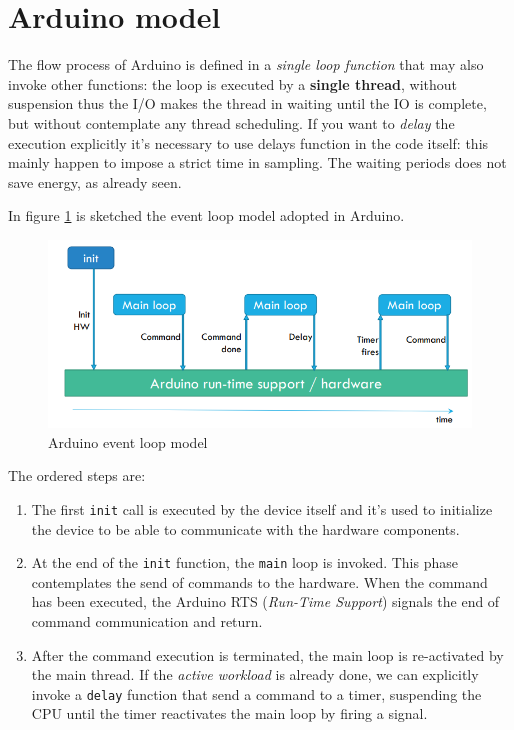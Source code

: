 \documentclass[10pt,a4paper]{report}
\theoremstyle{definition}
\begin{document}
\section{Arduino model}\label{sec:arduino-model}
The flow process of Arduino is defined in a \textit{single loop function} that may also invoke other functions: the loop is executed by a \textbf{single thread}, without suspension thus the I/O makes the thread in waiting until the IO is complete, but without contemplate any thread scheduling. If you want to \textit{delay} the execution explicitly it's necessary to use delays function in the code itself: this mainly happen to impose a strict time in sampling. The waiting periods does not save energy, as already seen.

In figure \ref{arduino-event-loop} is sketched the event loop model adopted in Arduino.

\begin{figure}[b!]
	\centering\includegraphics[scale=0.50]{images/Pasted image 20230418100640.png}
	\caption{Arduino event loop model}
	\label{arduino-event-loop}
\end{figure}

The ordered steps are:
\begin{enumerate}
	\item 
	The first \texttt{init} call is executed by the device itself and it's used to initialize the device to be able to communicate with the hardware components.
	\item 
	At the end of the \texttt{init} function, the \texttt{main} loop is invoked. This phase contemplates the send of commands to the hardware. When the command has been executed, the Arduino RTS (\textit{Run-Time Support}) signals the end of command communication and return.
	\item 
	After the command execution is terminated, the main loop is re-activated by the main thread. If the \textit{active workload} is already done, we can explicitly invoke a \texttt{delay} function that send a command to a timer, suspending the CPU until the timer reactivates the main loop by firing a signal.
\end{enumerate}
\end{document}
